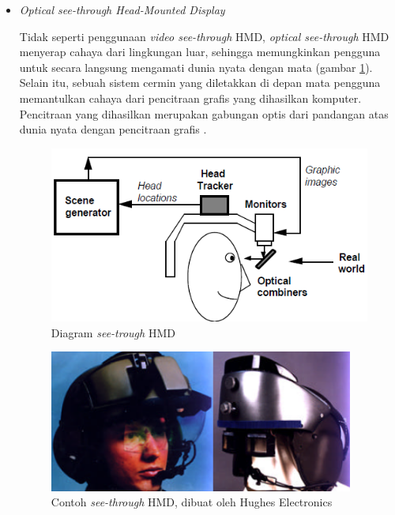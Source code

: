 \begin{itemize}
\item {\textit{Optical see-through Head-Mounted Display}}

Tidak seperti penggunaan \textit{video see-through} HMD, \textit{optical see-through} HMD  menyerap cahaya dari lingkungan luar, sehingga memungkinkan pengguna untuk secara langsung mengamati dunia nyata dengan mata (gambar \ref{fig:see-trough_HMD}). Selain itu, sebuah sistem cermin yang diletakkan di depan mata pengguna memantulkan cahaya dari pencitraan grafis yang dihasilkan komputer. Pencitraan yang dihasilkan merupakan gabungan optis dari pandangan atas dunia nyata dengan pencitraan grafis \cite{Azuma1997}.

\begin{figure}[h]
\begin{center}
\includegraphics[width=11cm]{./images/see-trough_HMD}
\caption{\label{fig:see-trough_HMD} Diagram \textit{see-trough} HMD}
\end{center}
\end{figure}

\begin{figure}[h]
\begin{center}
\includegraphics[width=10cm]{./images/actual_see-trough_HMD}
\caption {\label{fig:actual_see_trough_HMD} Contoh \textit{see-through} HMD, dibuat oleh Hughes Electronics}
\end{center}
\end{figure}

\end{itemize}

